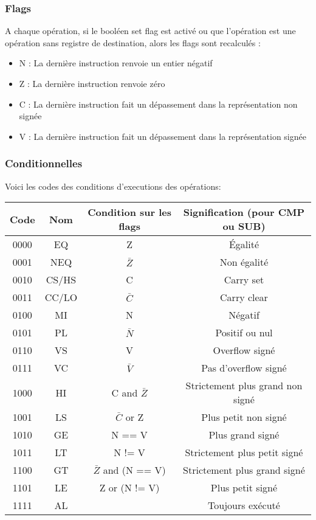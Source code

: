 \documentclass[a4paper]{article}
\begin{document}
\subsubsection{Flags}

A chaque opération, si le booléen set flag est activé ou que l'opération est une opération sans registre de destination, alors les flags sont
recalculés :
  \begin{itemize}
  \item N : La dernière instruction renvoie un entier négatif
  \item Z : La dernière instruction renvoie zéro
  \item C : La dernière instruction fait un dépassement dans la représentation
    non signée
  \item V : La dernière instruction fait un dépassement dans la représentation
    signée
  \end{itemize}

  \subsubsection{Conditionnelles}

  Voici les codes des conditions d'executions des opérations:\\

\begin{tabular}{|c|c|c|c|}
  \hline
  Code & Nom & Condition sur les flags & Signification (pour CMP ou SUB)\\
  \hline
  0000 & EQ & Z & Égalité\\
  0001 & NEQ & $\bar{Z}$ & Non égalité\\
  0010 & CS/HS & C & Carry set\\
  0011 & CC/LO & $\bar{C}$ & Carry clear\\
  0100 & MI & N & Négatif \\
  0101 & PL & $\bar{N}$ & Positif ou nul \\
  0110 & VS & V & Overflow signé \\
  0111 & VC & $\bar{V}$ & Pas d'overflow signé \\
  1000 & HI & C and $\bar{Z}$ & Strictement plus grand non signé \\
  1001 & LS & $\bar{C}$ or Z & Plus petit non signé \\
  1010 & GE & N == V & Plus grand signé \\
  1011 & LT & N != V & Strictement plus petit signé\\
  1100 & GT & $\bar{Z}$ and (N == V) & Strictement plus grand signé \\
  1101 & LE & Z or (N != V) & Plus petit signé \\
  1111 & AL &  & Toujours exécuté \\
  \hline
\end{tabular}
\end{document}
